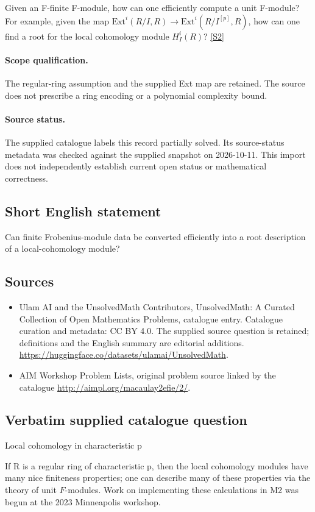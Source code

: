 \documentclass[11pt]{article}
\begin{document}
Given an F-finite F-module, how can one efficiently compute a unit F-module? For example, given the map $\mathrm{Ext}^i(R/I,R)\to \mathrm{Ext}^i(R/I^{[p]},R)$, how can one find a root for the local cohomology module $H^i_I(R)$? \href{http://aimpl.org/macaulay2efie/2/}{[S2]}
\paragraph{Scope qualification.}
The regular-ring assumption and the supplied Ext map are retained. The source does not prescribe a ring encoding or a polynomial complexity bound.
\paragraph{Source status.}
The supplied catalogue labels this record partially solved. Its source-status metadata was checked against the supplied snapshot on 2026-10-11. This import does not independently establish current open status or mathematical correctness.
\subsection{Short English statement}
Can finite Frobenius-module data be converted efficiently into a root description of a local-cohomology module?
\subsection{Sources}
\begin{itemize}
\item[S1] Ulam AI and the UnsolvedMath Contributors, UnsolvedMath: A Curated Collection of Open Mathematics Problems, catalogue entry. Catalogue curation and metadata: CC BY 4.0. The supplied source question is retained; definitions and the English summary are editorial additions.
\url{https://huggingface.co/datasets/ulamai/UnsolvedMath}.
\item[S2] AIM Workshop Problem Lists, original problem source linked by the catalogue
\url{http://aimpl.org/macaulay2efie/2/}.
\end{itemize}
\subsection{Verbatim supplied catalogue question}
Local cohomology in characteristic p

If R is a regular ring of characteristic p, then the local cohomology modules have many nice finiteness properties; one can describe many of these properties via the theory of unit $F$-modules. Work on implementing these calculations in M2 was begun at the 2023 Minneapolis workshop.
\end{document}
